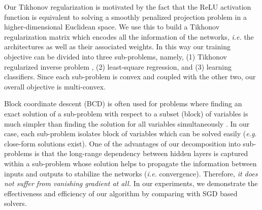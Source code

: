 \documentclass{article}
\def\eg{\emph{e.g. }}
\def\ie{\emph{i.e. }}
\begin{document}
	Our Tikhonov regularization is motivated by the fact that the ReLU activation function is equivalent to solving a smoothly penalized projection problem in a higher-dimensional Euclidean space.  We use this to build a  Tikhonov regularization matrix which encodes all the information of the networks, %
\ie the architectures as well as their associated weights. In this way our training objective can be divided into three sub-problems, namely, (1) Tikhonov regularized inverse problem \cite{willoughby1979solutions}, (2) least-square regression, and (3) learning classifiers. Since each sub-problem is convex and coupled with the other two, our overall objective is multi-convex. %
	
	Block coordinate descent (BCD) is often used for problems where finding an exact solution of a sub-problem with respect to a subset (block) of variables is much simpler than finding the solution for all variables simultaneously \cite{nesterov2012efficiency}. In our case, each sub-problem isolates block of variables which can be solved easily (\eg close-form solutions exist). %
One of the advantages of our decomposition into sub-problems is that the long-range dependency between hidden layers is captured within a sub-problem whose solution helps to propagate the information between inputs and outputs to stabilize the networks (\ie convergence). Therefore, {\em it does not suffer from vanishing gradient at all.}
	In our experiments, we demonstrate the effectiveness and efficiency of our algorithm by comparing with SGD based solvers.%
	
\end{document}
